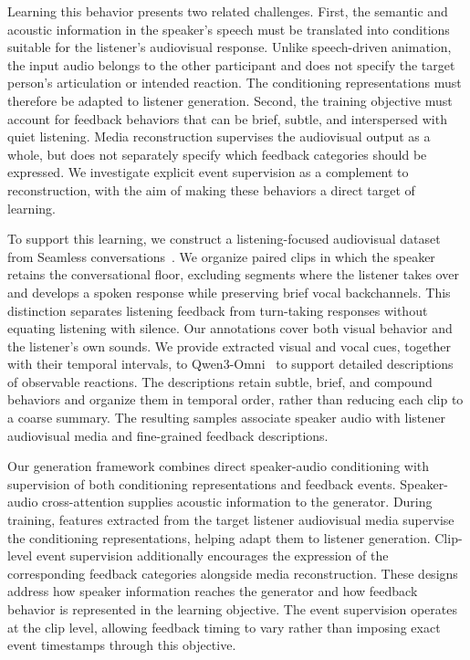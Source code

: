 Learning this behavior presents two related challenges. First,
the semantic and acoustic information in the speaker's speech
must be translated into conditions suitable for the listener's
audiovisual response. Unlike speech-driven animation, the input
audio belongs to the other participant and does not specify
the target person's articulation or intended reaction. The
conditioning representations must therefore be adapted to
listener generation. Second, the training objective must
account for feedback behaviors that can be brief, subtle, and
interspersed with quiet listening. Media reconstruction
supervises the audiovisual output as a whole, but does not
separately specify which feedback categories should be
expressed. We investigate explicit event supervision as a
complement to reconstruction, with the aim of making these
behaviors a direct target of learning.

To support this learning, we construct a listening-focused
audiovisual dataset from Seamless
conversations~\cite{seamless}. We organize paired clips in
which the speaker retains the conversational floor, excluding
segments where the listener takes over and develops a spoken
response while preserving brief vocal backchannels. This
distinction separates listening feedback from turn-taking
responses without equating listening with silence. Our
annotations cover both visual behavior and the listener's
own sounds. We provide extracted visual and vocal cues,
together with their temporal intervals, to
Qwen3-Omni~\cite{qwen3omni} to support detailed descriptions
of observable reactions. The descriptions retain subtle,
brief, and compound behaviors and organize them in temporal
order, rather than reducing each clip to a coarse summary.
The resulting samples associate speaker audio with listener
audiovisual media and fine-grained feedback descriptions.

Our generation framework combines direct speaker-audio
conditioning with supervision of both conditioning
representations and feedback events. Speaker-audio
cross-attention supplies acoustic information to the
generator. During training, features extracted from the
target listener audiovisual media supervise the conditioning
representations, helping adapt them to listener generation.
Clip-level event supervision additionally encourages the
expression of the corresponding feedback categories alongside
media reconstruction. These designs address how speaker
information reaches the generator and how feedback behavior
is represented in the learning objective. The event
supervision operates at the clip level, allowing feedback
timing to vary rather than imposing exact event timestamps
through this objective.

